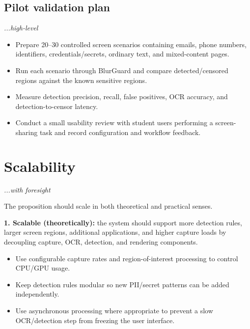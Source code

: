 \documentclass[12pt,a4paper]{article}
\begin{document}
\subsection{Pilot validation plan}
\hfill{\itshape\fontsize{8.3}{9.5}\selectfont ...high-level}

\begin{itemize}
    \item Prepare 20--30 controlled screen scenarios containing emails, phone numbers, identifiers, credentials/secrets, ordinary text, and mixed-content pages.

    \item Run each scenario through BlurGuard and compare detected/censored regions against the known sensitive regions.

    \item Measure detection precision, recall, false positives, OCR accuracy, and detection-to-censor latency.

    \item Conduct a small usability review with student users performing a screen-sharing task and record configuration and workflow feedback.
\end{itemize}

\section{Scalability}
\hfill{\itshape\fontsize{8.3}{9.5}\selectfont ...with foresight}

The proposition should scale in both theoretical and practical senses.

\textbf{1. Scalable (theoretically):} the system should support more detection rules, larger screen regions, additional applications, and higher capture loads by decoupling capture, OCR, detection, and rendering components.

\begin{itemize}
    \item Use configurable capture rates and region-of-interest processing to control CPU/GPU usage.

    \item Keep detection rules modular so new PII/secret patterns can be added independently.

    \item Use asynchronous processing where appropriate to prevent a slow OCR/detection step from freezing the user interface.
\end{itemize}
\end{document}
